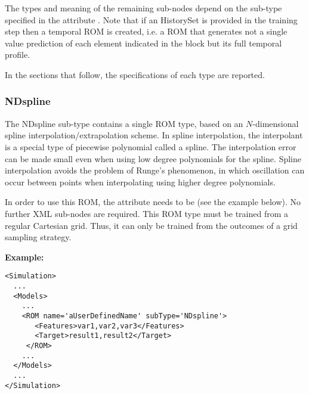 The types and meaning of the remaining sub-nodes depend on the sub-type
specified in the attribute .
%
Note that if an HistorySet is provided in the training step then a temporal ROM is created, i.e. a ROM that generates not a single value prediction of each element indicated in the   block but its full temporal profile.

In the sections that follow, the specifications of each type are reported.
%
\subsubsection{NDspline}
\label{subsubsec:NDspline}
The NDspline sub-type contains a single ROM type, based on an $N$-dimensional
spline interpolation/extrapolation scheme.
%
In spline interpolation, the interpolant is a special type of piecewise
polynomial called a spline.
%
The interpolation error can be made small even when using low degree polynomials
for the spline.
%
Spline interpolation avoids the problem of Runge's phenomenon, in which
oscillation can occur between points when interpolating using higher degree
polynomials.
%

In order to use this ROM, the  attribute  needs to
be  (see the example below).
%
No further XML sub-nodes are required.
%
\nb This ROM type must be trained from a regular Cartesian grid.
%
Thus, it can only be trained from the outcomes of a grid sampling strategy.

\textbf{Example:}
\begin{lstlisting}[style=XML,morekeywords={name,subType}]
<Simulation>
  ...
  <Models>
    ...
    <ROM name='aUserDefinedName' subType='NDspline'>
       <Features>var1,var2,var3</Features>
       <Target>result1,result2</Target>
     </ROM>
    ...
  </Models>
  ...
</Simulation>
\end{lstlisting}

